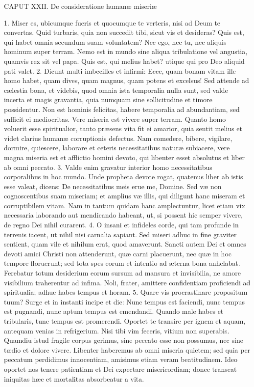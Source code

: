 CAPUT XXII.
De consideratione humanæ miseriæ

1. Miser es, ubicumque fueris et quocumque te verteris, nisi ad Deum te convertas. Quid turbaris, quia non succedit tibi, sicut vis et desideras? Quis est, qui habet omnia secundum suam voluntatem? Nec ego, nec tu, nec aliquis hominum super terram. Nemo est in mundo sine aliqua tribulatione vel angustia, quamvis rex sit vel papa. Quis est, qui melius habet? utique qui pro Deo aliquid pati valet.
2. Dicunt multi imbecilles et infirmi: Ecce, quam bonam vitam ille homo habet, quam dives, quam magnus, quam potens et excelsus! Sed attende ad cælestia bona, et videbis, quod omnia ista temporalia nulla sunt, sed valde incerta et magis gravantia, quia numquam sine sollicitudine et timore possidentur. Non est hominis felicitas, habere temporalia ad abundantiam, sed sufficit ei mediocritas. Vere miseria est vivere super terram. Quanto homo voluerit esse spiritualior, tanto præsens vita fit ei amarior, quia sentit melius et videt clarius humanæ corruptionis defectus. Nam comedere, bibere, vigilare, dormire, quiescere, laborare et ceteris necessitatibus naturæ subiacere, vere magna miseria est et afflictio homini devoto, qui libenter esset absolutus et liber ab omni peccato.
3. Valde enim gravatur interior homo necessitatibus corporalibus in hoc mundo. Unde propheta devote rogat, quatenus liber ab istis esse valeat, dicens: De necessitatibus meis erue me, Domine. Sed væ non cognoscentibus suam miseriam; et amplius væ illis, qui diligunt hanc miseram et corruptibilem vitam. Nam in tantum quidam hanc amplectuntur, licet etiam vix necessaria laborando aut mendicando habeant, ut, si possent hic semper vivere, de regno Dei nihil curarent.
4. O insani et infideles corde, qui tam profunde in terrenis iacent, ut nihil nisi carnalia sapiant. Sed miseri adhuc in fine graviter sentient, quam vile et nihilum erat, quod amaverunt. Sancti autem Dei et omnes devoti amici Christi non attenderunt, quæ carni placuerunt, nec quæ in hoc tempore floruerunt; sed tota spes eorum et intentio ad æterna bona anhelabat. Ferebatur totum desiderium eorum sursum ad mansura et invisibilia, ne amore visibilium traherentur ad infima. Noli, frater, amittere confidentiam proficiendi ad spiritualia; adhuc habes tempus et horam.
5. Quare vis procrastinare propositum tuum? Surge et in instanti incipe et dic: Nunc tempus est faciendi, nunc tempus est pugnandi, nunc aptum tempus est emendandi. Quando male habes et tribularis, tunc tempus est promerendi. Oportet te transire per ignem et aquam, antequam venias in refrigerium. Nisi tibi vim feceris, vitium non superabis. Quamdiu istud fragile corpus gerimus, sine peccato esse non possumus, nec sine tædio et dolore vivere. Libenter haberemus ab omni miseria quietem; sed quia per peccatum perdidimus innocentiam, amisimus etiam veram beatitudinem. Ideo oportet nos tenere patientiam et Dei expectare misericordiam; donec transeat iniquitas hæc et mortalitas absorbeatur a vita.
